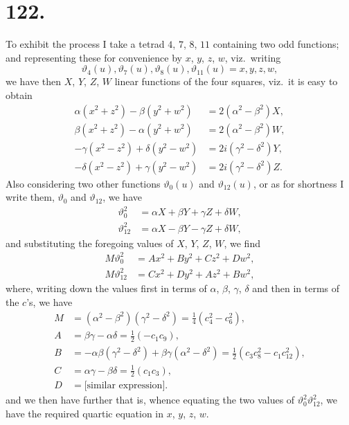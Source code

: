 \documentclass[11pt,a4paper]{article}
\newcommand{\uth}[1]{\vartheta_{#1}}
\begin{document}
\newpage
\section*{122.}
\label{sec:122}

To exhibit the process I take a tetrad $4$, $7$, $8$, $11$ containing two odd functions; and representing these for convenience by $x$, $y$, $z$, $w$, viz.\ writing
\[
\uth{4}(u), \uth{7}(u), \uth{8}(u), \uth{11}(u) = x, y, z, w,
\]
we have then $X$, $Y$, $Z$, $W$ linear functions of the four squares, viz.\ it is easy to obtain
\begin{align*}
\alpha(x^2 + z^2) - \beta(y^2 + w^2) &= 2(\alpha^2 - \beta^2)X, \\
\beta(x^2 + z^2) - \alpha(y^2 + w^2) &= 2(\alpha^2 - \beta^2)W, \\
-\gamma(x^2 - z^2) + \delta(y^2 - w^2) &= 2i(\gamma^2 - \delta^2)Y, \\
-\delta(x^2 - z^2) + \gamma(y^2 - w^2) &= 2i(\gamma^2 - \delta^2)Z.
\end{align*}
Also considering two other functions $\uth{0}(u)$ and $\uth{12}(u)$, or as for shortness I write them, $\uth{0}$ and $\uth{12}$, we have
\begin{align*}
\uth{0}^2 &= \alpha X + \beta Y + \gamma Z + \delta W, \\
\uth{12}^2 &= \alpha X - \beta Y - \gamma Z + \delta W,
\end{align*}
and substituting the foregoing values of $X$, $Y$, $Z$, $W$, we find
\begin{align*}
M\uth{0}^2 &= Ax^2 + By^2 + Cz^2 + Dw^2, \\
M\uth{12}^2 &= Cx^2 + Dy^2 + Az^2 + Bw^2,
\end{align*}
where, writing down the values first in terms of $\alpha$, $\beta$, $\gamma$, $\delta$ and then in terms of the $c$'s, we have
\begin{align*}
M &= (\alpha^2 - \beta^2)(\gamma^2 - \delta^2) = \tfrac{1}{4}(c_4^2 - c_6^2), \\
A &= \beta\gamma - \alpha\delta = \tfrac{1}{2}(-c_1c_9), \\
B &= -\alpha\beta(\gamma^2 - \delta^2) + \beta\gamma(\alpha^2 - \delta^2) = \tfrac{1}{2}(c_3c_8^2 - c_1c_{12}^2), \\
C &= \alpha\gamma - \beta\delta = \tfrac{1}{2}(c_1c_3), \\
D &= \text{[similar expression]}.
\end{align*}
and we then have further that is, whence equating the two values of $\uth{0}^2\uth{12}^2$, we have the required quartic equation in $x$, $y$, $z$, $w$.
\end{document}
